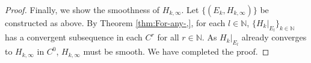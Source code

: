 \documentclass[10pt,a4paper]{amsart}
\def\N{\mathbb N}
\begin{document}
\begin{proof}
Finally, we show the smoothness of $H_{k,\infty}$. Let $\{(E_{k},H_{k,\infty})\}$
be constructed as above. By Theorem \ref{thm:For-any-,}, for each
$l\in\N$, $\{H_{k}|_{E_{l}}\}_{k\in\N}$ has a convergent subsequence
in each $C^{r}$ for all $r\in\N$. As $H_{k}|_{E_{l}}$ already converges
to $H_{k,\infty}$ in $C^{0}$, $H_{k,\infty}$ must be smooth. We
have completed the proof.
\end{proof}
\end{document}
